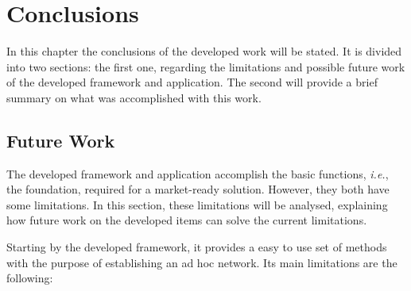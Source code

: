 
\chapter{Conclusions}
\label{chapter:conclusion}

In this chapter the conclusions of the developed work will be stated. It is divided into two sections: the first one, regarding the limitations and possible future work of the developed framework and application. The second will provide a brief summary on what was accomplished with this work.

\section{Future Work}
\label{sec:futurework}

The developed framework and application accomplish the basic functions, \textit{i.e.}, the foundation, required for a market-ready solution. However, they both have some limitations. In this section, these limitations will be analysed, explaining how future work on the developed items can solve the current limitations.

Starting by the developed framework, it provides a easy to use set of methods with the purpose of establishing an ad hoc network. Its main limitations are the following:


